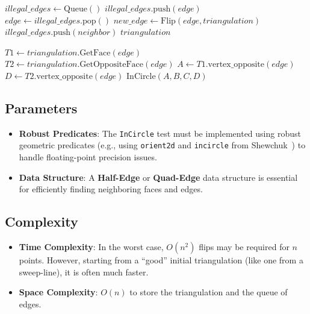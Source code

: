 \begin{algorithm}[htbp]
\caption{Delaunay Edge Flip Algorithm}
\label{alg:delaunay_flip}
\begin{algorithmic}[1]
  \State $illegal\_edges \gets \text{Queue}()$
      \State $illegal\_edges.\text{push}(edge)$
    \EndIf
  \EndFor
    \State $edge \gets illegal\_edges.\text{pop}()$
      \State $new\_edge \gets \text{Flip}(edge, triangulation)$
          \State $illegal\_edges.\text{push}(neighbor)$
        \EndIf
      \EndFor
    \EndIf
  \EndWhile
  \State \Return $triangulation$
\EndFunction

  \State $T1 \gets triangulation.\text{GetFace}(edge)$
  \State $T2 \gets triangulation.\text{GetOppositeFace}(edge)$
  \State $A \gets T1.\text{vertex\_opposite}(edge)$
  \State $D \gets T2.\text{vertex\_opposite}(edge)$
  \State \Return $\text{InCircle}(A, B, C, D)$
\EndFunction
\end{algorithmic}
\end{algorithm}

\subsection{Parameters}

\begin{itemize}
\item \textbf{Robust Predicates}: The \texttt{InCircle} test must be implemented using robust geometric predicates (e.g., using \texttt{orient2d} and \texttt{incircle} from Shewchuk~\cite{shewchuk1997}) to handle floating-point precision issues.
\item \textbf{Data Structure}: A \textbf{Half-Edge} or \textbf{Quad-Edge} data structure is essential for efficiently finding neighboring faces and edges.
\end{itemize}

\subsection{Complexity}

\begin{itemize}
\item \textbf{Time Complexity}: In the worst case, $O(n^2)$ flips may be required for $n$ points. However, starting from a ``good'' initial triangulation (like one from a sweep-line), it is often much faster.
\item \textbf{Space Complexity}: $O(n)$ to store the triangulation and the queue of edges.
\end{itemize}


